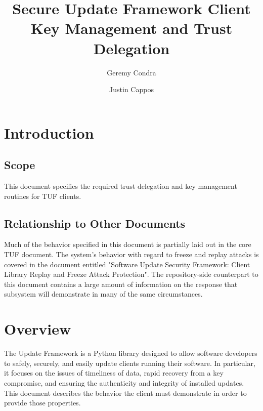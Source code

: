 \documentclass{article}
\begin{document}
\title{Secure Update Framework Client Key Management and Trust Delegation}
\author{Geremy Condra \and Justin Cappos}
\maketitle


\section{Introduction}
\subsection{Scope}
This document specifies the required trust delegation and key management routines
for TUF clients.
\subsection{Relationship to Other Documents}
Much of the behavior specified in this document is partially laid out in the
core TUF document. The system's behavior with regard to freeze and replay
attacks is covered in the document entitled "Software Update Security Framework: 
Client Library Replay and Freeze Attack Protection". The repository-side counterpart
to this document contains a large amount of information on the response that
subsystem will demonstrate in many of the same circumstances. 

\section{Overview}
The Update Framework is a Python library designed to allow software developers to safely,
securely, and easily update clients running their software. In particular, it
focuses on the issues of timeliness of data, rapid recovery from a key compromise,
and ensuring the authenticity and integrity of installed updates. This document
describes the behavior the client must demonstrate in order to provide those
properties.
\end{document}
